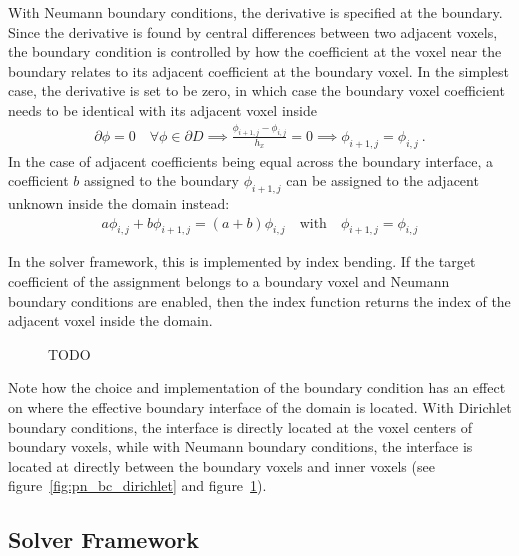 With Neumann boundary conditions, the derivative is specified at the boundary. Since the derivative is found by central differences between two adjacent voxels, the boundary condition is controlled by how the coefficient at the voxel near the boundary relates to its adjacent coefficient at the boundary voxel. In the simplest case, the derivative is set to be zero, in which case the boundary voxel coefficient needs to be identical with its adjacent voxel inside
\begin{align*}
\partial\phi=0\quad\forall\phi\in\partial D
\implies
\frac{\phi_{i+1,j}-\phi_{i,j}}{h_x} = 0
\implies
\phi_{i+1,j}=\phi_{i,j}
\ .
\end{align*}
In the case of adjacent coefficients being equal across the boundary interface, a coefficient $b$ assigned to the boundary $\phi_{i+1,j}$ can be assigned to the adjacent unknown inside the domain instead:
\begin{align}
a\phi_{i,j} + b\phi_{i+1,j} = \left(a+b\right)\phi_{i,j}
\quad \text{with}\quad \phi_{i+1,j}=\phi_{i,j}
\end{align}

In the solver framework, this is implemented by index bending. If the target coefficient of the assignment belongs to a boundary voxel and Neumann boundary conditions are enabled, then the index function returns the index of the adjacent voxel inside the domain.
\begin{figure}[h]
\centering
{}
\caption{TODO}
\label{fig:pn_bc_neumann}
\end{figure}

Note how the choice and implementation of the boundary condition has an effect on where the effective boundary interface of the domain is located. With Dirichlet boundary conditions, the interface is directly located at the voxel centers of boundary voxels, while with Neumann boundary conditions, the interface is located at directly between the boundary voxels and inner voxels (see figure~\ref{fig:pn_bc_dirichlet} and figure~\ref{fig:pn_bc_neumann}).

\subsection{Solver Framework}
\label{sec:pn_framework}

